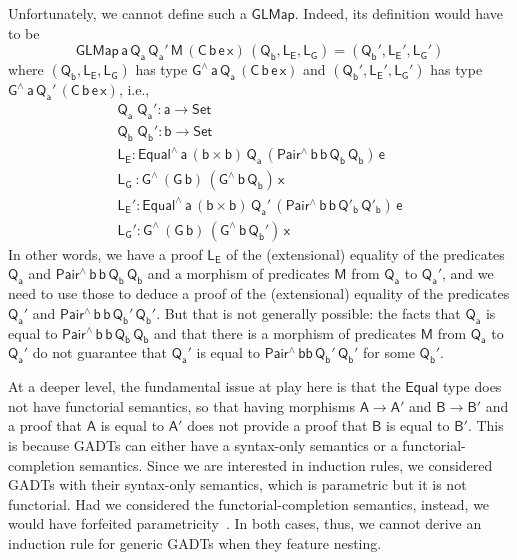 \documentclass[acmsmall,screen,review,anonymous]{acmart}
\theoremstyle{definition}
\begin{document}
Unfortunately, we cannot define such a $\mathsf{GLMap}$.
Indeed, its definition would have to be
\[
\mathsf{GLMap\,a\,Q_a\,Q_a'\,M\,(C\,b\,e\,x)\,(Q_b, L_E, L_G) = (Q_b', L_E', L_G')}
\]
where $\mathsf{(Q_b, L_E, L_G)}$ has type $\mathsf{G^{\wedge}\,a\,Q_a\,(C\,b\,e\,x)}$
and $\mathsf{(Q_b', L_E', L_G')}$ has type $\mathsf{G^{\wedge}\,a\,Q_a'\,(C\,b\,e\,x)}$, i.e.,
\begin{gather*}
\mathsf{Q_a\;Q_a' : a \to Set} \\
\mathsf{Q_b\;Q_b' : b \to Set} \\
\mathsf{L_E : Equal^{\wedge}\,a\,(b \times b)\,Q_a\,(Pair^{\wedge}\,b\,b\,Q_b\,Q_b)\,e} \\
\mathsf{L_G\ : G^{\wedge}\,(G\,b)\,(G^{\wedge}\,b\,Q_b)\,x} \\
\mathsf{L_E' : Equal^{\wedge}\,a\,(b \times b)\,Q_a'\,(Pair^{\wedge}\,b\,b\,Q'_b\,Q'_b)\,e} \\
\mathsf{L_G' : G^{\wedge}\,(G\,b)\,(G^{\wedge}\,b\,Q_b')\,x}
\end{gather*}
In other words, we have a proof $\mathsf{L_E}$ of the (extensional) equality
of the predicates $\mathsf{Q_a}$ and $\mathsf{Pair^{\wedge}\,b\,b\,Q_b\,Q_b}$
and a morphism of predicates $\mathsf{M}$ from $\mathsf{Q_a}$ to $\mathsf{Q_a'}$,
and we need to use those to deduce a proof of the (extensional) equality
of the predicates $\mathsf{Q_a'}$ and $\mathsf{Pair^{\wedge}\,b\,b\,Q_b'\,Q_b'}$.
But that is not generally possible:
the facts that $\mathsf{Q_a}$ is equal to $\mathsf{Pair^{\wedge}\,b\,b\,Q_b\,Q_b}$
and that there is a morphism of predicates $\mathsf{M}$ from $\mathsf{Q_a}$ to $\mathsf{Q_a'}$
do not guarantee that $\mathsf{Q_a'}$ is equal to $\mathsf{Pair^{\wedge}\,bb\,Q_b'\,Q_b'}$ for some $\mathsf{Q_b'}$.

At a deeper level, the fundamental issue at play here is that
the $\mathsf{Equal}$ type does not have functorial semantics,
so that having morphisms $\mathsf{A \to A'}$ and $\mathsf{B \to B'}$
and a proof that $\mathsf{A}$ is equal to $\mathsf{A'}$
does not provide a proof that $\mathsf{B}$ is equal to $\mathsf{B'}$.
This is because GADTs can either have a syntax-only semantics or a functorial-completion semantics.
Since we are interested in induction rules, we considered GADTs with their syntax-only semantics,
which is parametric but it is not functorial.
Had we considered the functorial-completion semantics, instead,
we would have forfeited parametricity~\cite{HaskellPaper}.
In both cases, thus, we cannot derive an induction rule for generic GADTs when they feature nesting.
\end{document}
